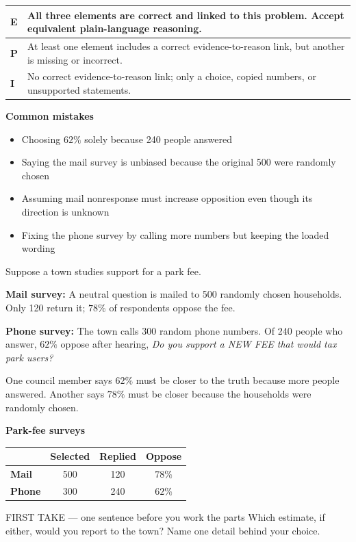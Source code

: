 \documentclass[11pt]{article}
\begin{document}
{\small\renewcommand{\arraystretch}{1.25}
\noindent\begin{tabular}{|p{0.5in}|p{5.9in}|}
\hline
\textbf{E} & All three elements are correct and linked to this problem. Accept equivalent plain-language reasoning. \\ \hline
\textbf{P} & At least one element includes a correct evidence-to-reason link, but another is missing or incorrect. \\ \hline
\textbf{I} & No correct evidence-to-reason link; only a choice, copied numbers, or unsupported statements. \\ \hline
\end{tabular}}

\textbf{Common mistakes}
\begin{itemize}[leftmargin=1.5em,itemsep=2pt,topsep=2pt]
  \item Choosing $62\%$ solely because 240 people answered
  \item Saying the mail survey is unbiased because the original 500 were randomly chosen
  \item Assuming mail nonresponse must increase opposition even though its direction is unknown
  \item Fixing the phone survey by calling more numbers but keeping the loaded wording
\end{itemize}

\clearpage
{}

Suppose a town studies support for a park fee.\par\smallskip \textbf{Mail survey:} A neutral question is mailed to 500 randomly chosen households. Only 120 return it; $78\%$ of respondents oppose the fee.\par \textbf{Phone survey:} The town calls 300 random phone numbers. Of 240 people who answer, $62\%$ oppose after hearing, \emph{Do you support a NEW FEE that would tax park users?}\par\smallskip One council member says $62\%$ must be closer to the truth because more people answered. Another says $78\%$ must be closer because the households were randomly chosen.\par
\begin{center}
\textbf{Park-fee surveys}\par\smallskip
\begin{tabular}{|l|c|c|c|}
\hline
\textbf{} & \textbf{Selected} & \textbf{Replied} & \textbf{Oppose} \\ \hline
\textbf{Mail} & 500 & 120 & $78\%$ \\ \hline
\textbf{Phone} & 300 & 240 & $62\%$ \\ \hline
\end{tabular}
\end{center}
\begin{firsttakebox}{FIRST TAKE --- one sentence before you work the parts}
Which estimate, if either, would you report to the town? Name one detail behind your choice.\par
{}
\end{firsttakebox}
\end{document}
